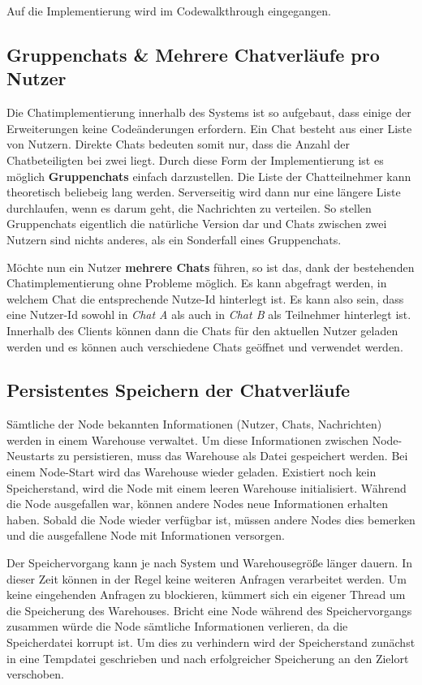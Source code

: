 Auf die Implementierung wird im Codewalkthrough eingegangen.

\author{Matthias Vonend, Aaron Schweig, Troy Keßler}
\subsection{Gruppenchats \& Mehrere Chatverläufe pro Nutzer}
Die Chatimplementierung innerhalb des Systems ist so aufgebaut, dass einige der Erweiterungen keine Codeänderungen erfordern.
Ein Chat besteht aus einer Liste von Nutzern. Direkte Chats bedeuten somit nur, dass die Anzahl der Chatbeteiligten bei zwei liegt.
Durch diese Form der Implementierung ist es möglich \textbf{Gruppenchats} einfach darzustellen. Die Liste der Chatteilnehmer kann theoretisch
beliebeig lang werden. Serverseitig wird dann nur eine längere Liste durchlaufen, wenn es darum geht, die Nachrichten zu verteilen.
So stellen Gruppenchats eigentlich die natürliche Version dar und Chats zwischen zwei Nutzern sind nichts anderes, als ein Sonderfall eines Gruppenchats.

Möchte nun ein Nutzer \textbf{mehrere Chats} führen, so ist das, dank der bestehenden Chatimplementierung ohne Probleme möglich. Es kann abgefragt werden, in welchem Chat
die entsprechende Nutze-Id hinterlegt ist. Es kann also sein, dass eine Nutzer-Id sowohl in \textit{Chat A} als auch in \textit{Chat B} als Teilnehmer hinterlegt ist.
Innerhalb des Clients können dann die Chats für den aktuellen Nutzer geladen werden und es können auch verschiedene Chats geöffnet und verwendet werden.


\author{Matthias Vonend}
\subsection{Persistentes Speichern der Chatverläufe}\label{persistance}
Sämtliche der Node bekannten Informationen (Nutzer, Chats, Nachrichten) werden in einem Warehouse verwaltet. 
Um diese Informationen zwischen Node-Neustarts zu persistieren, muss das Warehouse als Datei gespeichert werden. 
Bei einem Node-Start wird das Warehouse wieder geladen. Existiert noch kein Speicherstand, wird die Node mit einem leeren Warehouse initialisiert.
Während die Node ausgefallen war, können andere Nodes neue Informationen erhalten haben. 
Sobald die Node wieder verfügbar ist, müssen andere Nodes dies bemerken und die ausgefallene Node mit Informationen versorgen. 

Der Speichervorgang kann je nach System und Warehousegröße länger dauern. 
In dieser Zeit können in der Regel keine weiteren Anfragen verarbeitet werden. 
Um keine eingehenden Anfragen zu blockieren, kümmert sich ein eigener Thread um die Speicherung des Warehouses.
Bricht eine Node während des Speichervorgangs zusammen würde die Node sämtliche Informationen verlieren, da die Speicherdatei korrupt ist.
Um dies zu verhindern wird der Speicherstand zunächst in eine Tempdatei geschrieben und nach erfolgreicher Speicherung an den Zielort verschoben.

